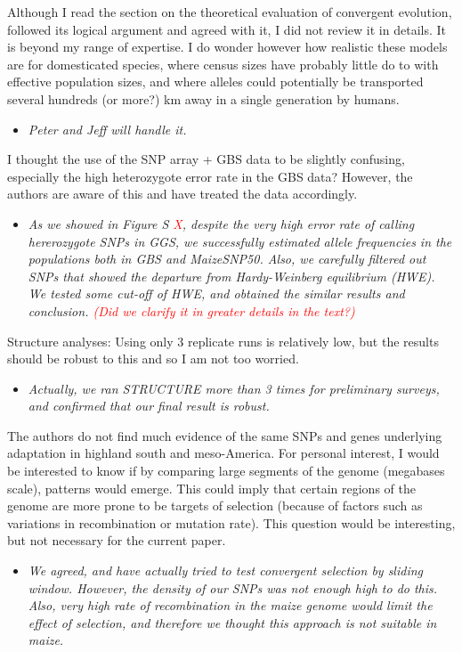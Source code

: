\documentclass[onecolumn,oneside,letterpaper]{article}
\newcommand{\st}[1]{\textcolor{red}{ #1}}
\newcommand{\comst}[1]{\textcolor{red}{ \em{\scriptsize  (#1)}} }
\begin{document}
Although I read the section on the theoretical evaluation of convergent evolution, followed its logical argument and agreed with it, I did not review it in details.  It is beyond my range of expertise.  I do wonder however how realistic these models are for domesticated species, where census sizes have probably little do to with effective population sizes, and where alleles could potentially be transported several hundreds (or more?) km away in a single generation by humans.  
\setlength{\parskip}{-5.0pt}
\begin{itemize}
\item \textit{ Peter and Jeff will handle it. }
\end{itemize}
\setlength{\parskip}{10.0pt}

I thought the use of the SNP array + GBS data to be slightly confusing, especially the high heterozygote error rate in the GBS data? However, the authors are aware of this and have treated the data accordingly.  
\setlength{\parskip}{-5.0pt}
\begin{itemize}
\item \textit{ As we showed in Figure S\st{X}, despite the very high error rate of calling hererozygote SNPs in GGS, we successfully estimated allele frequencies in the populations both in GBS and MaizeSNP50.  Also, we carefully filtered out SNPs that showed the departure from Hardy-Weinberg equilibrium (HWE).  We tested some cut-off of HWE, and obtained the similar results and conclusion.  \comst{Did we clarify it in greater details in the text?} }
\end{itemize}
\setlength{\parskip}{10.0pt}  

Structure analyses:  Using only 3 replicate runs is relatively low, but the results should be robust to this and so I am not too worried.  
\setlength{\parskip}{-5.0pt}
\begin{itemize}
\item \textit{ Actually, we ran STRUCTURE more than 3 times for preliminary surveys, and confirmed that our final result is robust. }
\end{itemize}
\setlength{\parskip}{10.0pt}

The authors do not find much evidence of the same SNPs and genes underlying adaptation in highland south and meso-America. For personal interest, I would be interested to know if by comparing large segments of the genome (megabases scale), patterns would emerge.  This could imply that certain regions of the genome are more prone to be targets of selection  (because of factors such as variations in recombination or mutation rate). This question would be interesting, but not necessary for the current paper.    
\setlength{\parskip}{-5.0pt}
\begin{itemize}
\item \textit{ We agreed, and have actually tried to test convergent selection by sliding window.  However, the density of our SNPs was not enough high to do this.  Also, very high rate of recombination in the maize genome would limit the effect of selection, and therefore we thought this approach is not suitable in maize. }
\end{itemize}
\setlength{\parskip}{10.0pt}
\end{document}
